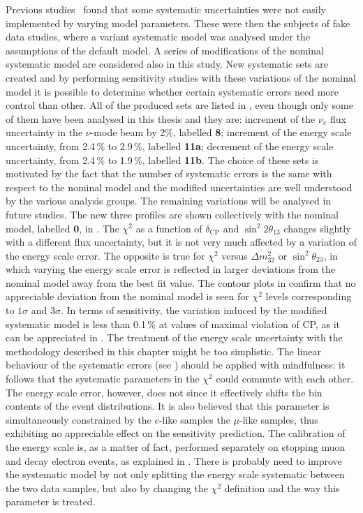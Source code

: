 Previous studies~\cite{Abe:2018wpn} found that some systematic uncertainties %
were not easily implemented by varying model parameters.
These were then the subjects of fake data studies, where a variant systematic model was analysed under %
the assumptions of the default model.
A series of modifications of the nominal systematic model are considered also in this study.
New systematic sets are created and by performing sensitivity studies with these variations of the nominal model %
it is possible to determine whether certain systematic errors need more control than other.
All of the produced sets are listed in , even though only %
some of them have been analysed in this thesis and they are:
increment of the $\nu_e$ flux uncertainty in the $\nu$-mode beam by 2\%, labelled \textbf{8}; %
increment of the energy scale uncertainty, from 2.4\,\% to 2.9\,\%, labelled \textbf{11a}; %
decrement of the energy scale uncertainty, from 2.4\,\% to 1.9\,\%, labelled \textbf{11b}.
The choice of these sets is motivated by the fact that the number of systematic errors is the same %
with respect to the nominal model and the modified uncertainties are well understood by the various analysis groups.
The remaining variations will be analysed in future studies.
The new three profiles are shown collectively with the nominal model, labelled \textbf{0}, in .
The $\chi^2$ as a function of $\delta_\text{CP}$ and $\sin^2 2\theta_{13}$ changes slightly with a different flux uncertainty, %
but it is not very much affected by a variation of the energy scale error.
The opposite is true for $\chi^2$ versus $\Delta m_{32}^2$ or $\sin^2\theta_{23}$, in which %
varying the energy scale error is reflected in larger deviations from the nominal model away from the best fit value.
The contour plots in  confirm that no appreciable deviation from the nominal model %
is seen for $\chi^2$ levels corresponding to $1\sigma$ and $3\sigma$.
In terms of sensitivity, the variation induced by the modified systematic model is %
less than 0.1\,\% at values of maximal violation of CP, as it can be appreciated in .
The treatment of the energy scale uncertainty with the methodology described in this chapter might be too simplistic.
The linear behaviour of the systematic errors (see ) should be applied with mindfulness: %
it follows that the systematic parameters in the $\chi^2$ could commute with each other.
The energy scale error, however, does not since it effectively shifts the bin contents of the event distributions.
It is also believed that this parameter is simultaneously constrained by the $e$-like samples %
the $\mu$-like samples, thus exhibiting no appreciable effect on the sensitivity prediction.
The calibration of the energy scale is, as a matter of fact, performed separately %
on stopping muon and decay electron events, as explained in .
There is probably need to improve the systematic model by not only splitting the energy scale systematic %
between the two data samples, but also by changing the $\chi^2$ definition and the way this parameter is treated.

